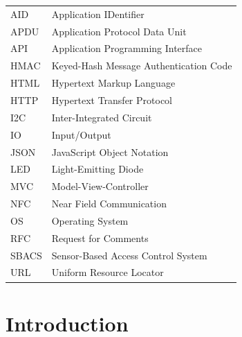 \documentclass[12pt]{report}
\begin{document}


\prefaceTOC   %
\listoffigures   %
\listoftables   %

                    
    
\begin{tabular}[t]{l@{\hspace*{2cm}}l}
    AID & Application IDentifier \\
    APDU & Application Protocol Data Unit \\
    API & Application Programming Interface \\
    HMAC & Keyed-Hash Message Authentication Code \\
	HTML & Hypertext Markup Language \\
	HTTP & Hypertext Transfer Protocol \\
    I2C & Inter-Integrated Circuit \\
    IO & Input/Output \\
    JSON & JavaScript Object Notation \\
    LED & Light-Emitting Diode \\
    MVC & Model-View-Controller \\
    NFC & Near Field Communication \\
    OS & Operating System \\
    RFC & Request for Comments \\
    SBACS & Sensor-Based Access Control System \\
    URL & Uniform Resource Locator \\
\end{tabular}


\endpreface
    

\chapter{Introduction} \label{introduction}
\end{document}
